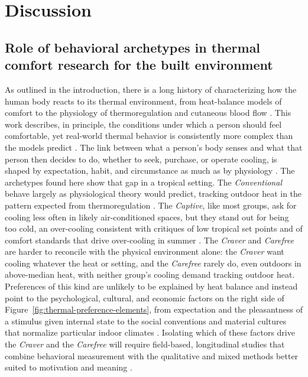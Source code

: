 \documentclass[final,5p,times,twocolumn]{elsarticle}
\begin{document}
\section{Discussion}\label{sec:discussion}

\subsection{Role of behavioral archetypes in thermal comfort research for the built environment}\label{sec:contribution}
As outlined in the introduction, there is a long history of characterizing how the human body reacts to its thermal environment, from heat-balance models of comfort to the physiology of thermoregulation and cutaneous blood flow \citep{Fanger1972-xq, Johnson2010-eh, Frank1999-ju}.
This work describes, in principle, the conditions under which a person should feel comfortable, yet real-world thermal behavior is consistently more complex than the models predict \citep{Cheung2019-fs, Dear1998-va}.
The link between what a person's body senses and what that person then decides to do, whether to seek, purchase, or operate cooling, is shaped by expectation, habit, and circumstance as much as by physiology \citep{Schweiker2020-pw, Osunmuyiwa2020-fr, Hitchings2011-eo}.
The archetypes found here show that gap in a tropical setting.
The \emph{Conventional} behave largely as physiological theory would predict, tracking outdoor heat in the pattern expected from thermoregulation \citep{Johnson2010-eh}.
The \emph{Captive}, like most groups, ask for cooling less often in likely air-conditioned spaces, but they stand out for being too cold, an over-cooling consistent with critiques of low tropical set points and of comfort standards that drive over-cooling in summer \citep{Schiavon2017-fx, Roaf2026-kt}.
The \emph{Craver} and \emph{Carefree} are harder to reconcile with the physical environment alone: the \emph{Craver} want cooling whatever the heat or setting, and the \emph{Carefree} rarely do, even outdoors in above-median heat, with neither group's cooling demand tracking outdoor heat.
Preferences of this kind are unlikely to be explained by heat balance and instead point to the psychological, cultural, and economic factors on the right side of Figure~\ref{fig:thermal-preference-elements}, from expectation and the pleasantness of a stimulus given internal state \citep{Schweiker2020-pw, Cabanac1971-mg} to the social conventions and material cultures that normalize particular indoor climates \citep{Shove2003-lf, Shove2014-fx, Healy2008-hk}.
Isolating which of these factors drive the \emph{Craver} and the \emph{Carefree} will require field-based, longitudinal studies that combine behavioral measurement with the qualitative and mixed methods better suited to motivation and meaning \citep{Hitchings2011-eo, Strengers2011-bm}.
\end{document}
